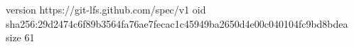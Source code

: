 version https://git-lfs.github.com/spec/v1
oid sha256:29d2474c6f89b3564fa76ae7fecac1c45949ba2650d4e00c040104fc9bd8bdea
size 61
